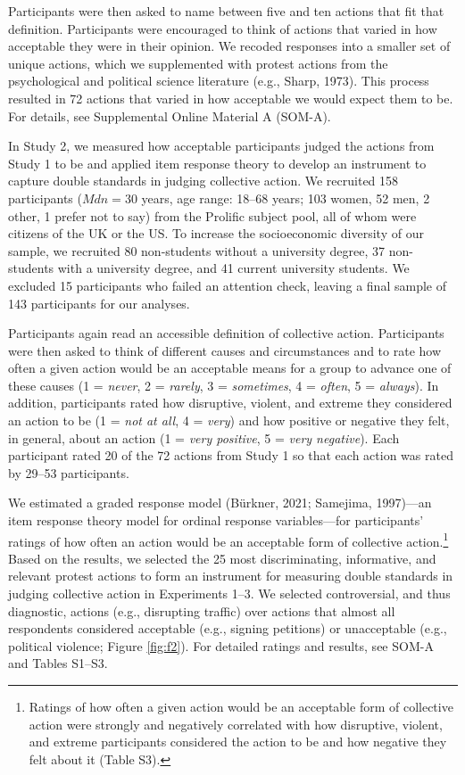 \documentclass[12pt, letterpaper]{article}
\begin{document}
\noindent Participants were then asked to name between five and ten
actions that fit that definition. Participants were encouraged to think
of actions that varied in how acceptable they were in their opinion. We
recoded responses into a smaller set of unique actions, which we
supplemented with protest actions from the psychological and political
science literature (e.g., Sharp, 1973). This process resulted in 72
actions that varied in how acceptable we would expect them to be. For
details, see Supplemental Online Material A (SOM-A).

In Study 2, we measured how acceptable participants judged the actions
from Study 1 to be and applied item response theory to develop an
instrument to capture double standards in judging collective action. We
recruited 158 participants (\(\textit{Mdn} = 30\) years, age range:
18--68 years; 103 women, 52 men, 2 other, 1 prefer not to say) from the
Prolific subject pool, all of whom were citizens of the UK or the US. To
increase the socioeconomic diversity of our sample, we recruited 80
non-students without a university degree, 37 non-students with a
university degree, and 41 current university students. We excluded 15
participants who failed an attention check, leaving a final sample of
143 participants for our analyses.

Participants again read an accessible definition of collective action.
Participants were then asked to think of different causes and
circumstances and to rate how often a given action would be an
acceptable means for a group to advance one of these causes (1 =
\emph{never}, 2 = \emph{rarely}, 3 = \emph{sometimes}, 4 = \emph{often},
5 = \emph{always}). In addition, participants rated how disruptive,
violent, and extreme they considered an action to be (1 = \emph{not at
all}, 4 = \emph{very}) and how positive or negative they felt, in
general, about an action (1 = \emph{very positive}, 5 = \emph{very
negative}). Each participant rated 20 of the 72 actions from Study 1 so
that each action was rated by 29--53 participants.

We estimated a graded response model (Bürkner, 2021; Samejima,
1997)---an item response theory model for ordinal response
variables---for participants' ratings of how often an action would be an
acceptable form of collective action.\footnote{Ratings of how often a
  given action would be an acceptable form of collective action were
  strongly and negatively correlated with how disruptive, violent, and
  extreme participants considered the action to be and how negative they
  felt about it (Table S3).} Based on the results, we selected the 25
most discriminating, informative, and relevant protest actions to form
an instrument for measuring double standards in judging collective
action in Experiments 1--3. We selected controversial, and thus
diagnostic, actions (e.g., disrupting traffic) over actions that almost
all respondents considered acceptable (e.g., signing petitions) or
unacceptable (e.g., political violence; Figure \ref{fig:f2}). For
detailed ratings and results, see SOM-A and Tables S1--S3.
\end{document}

